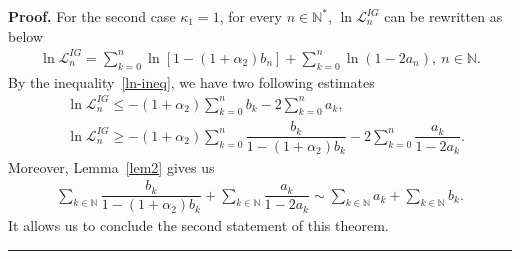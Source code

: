 \documentclass[10pt,a4paper]{amsart}
\newenvironment{proof}[1][Proof]{\textbf{#1.} }{\hfill\rule{0.5em}{0.5em}}
\begin{document}
\begin{proof}
			For the second case $\kappa_1=1$, for every $n \in \mathbb N^*$, $\ln \mathcal{L}_n^{IG}$ can be rewritten as below
			\begin{align*}
				\ln{\mathcal{L}_n^{IG}} = \sum_{k=0}^{n} \ln[1 - (1 + \alpha_2)b_n] + \sum_{k=0}^{n} \ln(1 - 2a_n), ~ n \in \mathbb{N}.
			\end{align*}
By the inequality~\eqref{ln-ineq}, we have two following estimates
			\begin{align*}
				&\ln{\mathcal{L}_n^{IG}} \le -(1+\alpha_2)\sum_{k=0}^{n}{b_k}-2\sum_{k=0}^{n}{a_k},\\
				&\ln{\mathcal{L}_n^{IG}} \ge -(1+\alpha_2)\sum_{k=0}^{n} \dfrac{b_k}{1-(1+\alpha_2)b_k} - 2\sum_{k=0}^{n} \dfrac{a_k}{1-2a_k}.
			\end{align*}
Moreover, Lemma~\ref{lem2} gives us
			\begin{align*} 
				\sum_{k \in \mathbb{N}} \dfrac{b_k}{1-(1+\alpha_2)b_k} + \sum_{k \in \mathbb{N}} \dfrac{a_k}{1-2a_k}  \sim \sum_{k \in \mathbb{N}}a_k+ \sum_{k \in \mathbb{N}}b_k.
			\end{align*}
It allows us to conclude the second statement of this theorem. 
		\end{proof}
\end{document}
